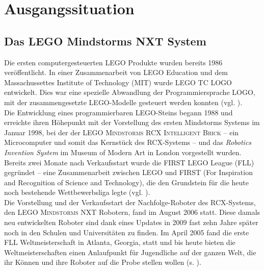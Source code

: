 \documentclass[paper=a4, DIV=calc, BCOR=12mm, twoside=on, onecolumn=on, open = right, titlepage =on, parskip =half-, headsepline = on, footsepline = off, chapterprefix = off, appendixprefix = on, fontsize = 12pt, numbers = noenddot, abstract = on]{scrbook}
\begin{document}
\chapter{Ausgangssituation}

\par\singlespacing
\section{Das LEGO Mindstorms NXT System}
\onehalfspacing
Die ersten computergesteuerten \textsc{LEGO} Produkte wurden bereits 1986 veröffentlicht. In einer Zusammenarbeit von \textsc{LEGO} Education und dem Massachussettes Institute of Technology (MIT) wurde \textsc{LEGO TC LOGO} entwickelt. Dies war eine spezielle Abwandlung der Programmiersprache LOGO, mit der zusammengesetzte \textsc{LEGO}-Modelle gesteuert werden konnten (vgl. \cite{rolling:14}).\\
Die Entwicklung eines programmierbaren \textsc{LEGO}-Steins begann 1988 und erreichte ihren Höhepunkt mit der Vorstellung des ersten Mindstorms Systems im Januar 1998, bei der der \textsc{LEGO Mindstorms RCX Intelligent Brick} -- ein Microcomputer und somit das Kernstück des RCX-Systems -- und das \emph{Robotics Invention System} im Museum of Modern Art in London vorgestellt wurden.\\
Bereits zwei Monate nach Verkaufsstart wurde die FIRST LEGO League (FLL) gegründet -- eine Zusammenarbeit zwischen \textsc{LEGO} und FIRST (For Inspiration and Recognition of Science and Technology), die den Grundstein für die heute noch bestehende Wettbewerbsliga legte (vgl. \cite{rolling:14}).\\
Die Vorstellung und der Verkaufsstart der Nachfolge-Roboter des RCX-Systems, den \textsc{LEGO Mindstorms} NXT Robotern, fand im August 2006 statt. Diese damals neu entwickelten Roboter sind dank eines Updates in 2009 fast zehn Jahre später noch in den Schulen und Universitäten zu finden. Im April 2005 fand die erste FLL Weltmeisterschaft in Atlanta, Georgia, statt und bis heute bieten die Weltmeisterschaften einen Anlaufpunkt für Jugendliche auf der ganzen Welt, die ihr Können und ihre Roboter auf die Probe stellen wollen (s. \cite{lego}).

\par \singlespacing
\end{document}
